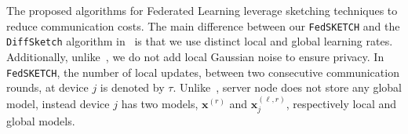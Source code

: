 \documentclass[twoside]{article}
\begin{document}
The proposed algorithms for Federated Learning leverage sketching techniques to reduce communication costs.
The main difference between our \texttt{FedSKETCH} and the \texttt{DiffSketch} algorithm in~\cite{li2019privacy} is that we use distinct local and global learning rates. Additionally, unlike~\cite{li2019privacy}, we do not add local Gaussian noise to ensure privacy. 
In \texttt{FedSKETCH}, the number of local updates, between two consecutive communication rounds, at device $j$ is denoted by $\tau$.
 Unlike~\cite{haddadpour2020federated}, server node does not store any global model, instead device $j$ has two models, $\boldsymbol{x}^{(r)}$ and $\boldsymbol{x}^{(\ell,r)}_j$, respectively local and global models. 
%
\end{document}
